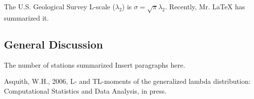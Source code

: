 \documentclass[11pt,twoside,twocolumn]{usgslatex/usgsreport}
\begin{document}
\makefrontcover
\makefrontmatter
\pagestyle{body}
The U.S. Geological Survey
L-scale ($\lambda_2$) is $\sigma = \sqrt{\pi}\lambda_2$.
Recently, Mr. LaTeX has summarized it.
\subsection{General Discussion}
The number of stations summarized 
Insert paragraphs here.
\REFSECTION
\begin{thebibliography}{9}
Asquith, W.H., 2006, L- and TL-moments of the generalized lambda 
distribution: Computational Statistics and Data Analysis, in
press.
\end{thebibliography}
\vspace*{\fill}
\clearpage
\pagestyle{backofreport}
\makebackcover
\end{document}
